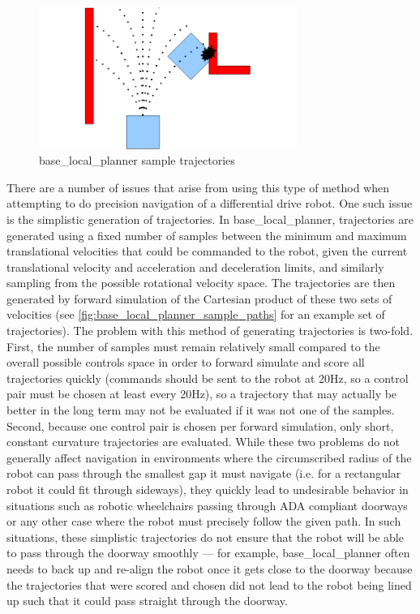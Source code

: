 \begin{figure}
\centering
\includegraphics[width=0.75\textwidth]{images/base_local_planner_sample_paths}
\caption[base\_local\_planner sample trajectories]{base\_local\_planner sample trajectories \autocite{BaseLocalPlannerWiki} \label{fig:base_local_planner_sample_paths}}
\end{figure}

There are a number of issues that arise from using this type of method when attempting to do precision navigation of a differential drive robot. One such issue is the simplistic generation of trajectories. In base\_local\_planner, trajectories are generated using a fixed number of samples between the minimum and maximum translational velocities that could be commanded to the robot, given the current translational velocity and acceleration and deceleration limits, and similarly sampling from the possible rotational velocity space. The trajectories are then generated by forward simulation of the Cartesian product of these two sets of velocities (see \autoref{fig:base_local_planner_sample_paths} for an example set of trajectories). The problem with this method of generating trajectories is two-fold. First, the number of samples must remain relatively small compared to the overall possible controls space in order to forward simulate and score all trajectories quickly (commands should be sent to the robot at 20Hz, so a control pair must be chosen at least every 20Hz), so a trajectory that may actually be better in the long term may not be evaluated if it was not one of the samples. Second, because one control pair is chosen per forward simulation, only short, constant curvature trajectories are evaluated. While these two problems do not generally affect navigation in environments where the circumscribed radius of the robot can pass through the smallest gap it must navigate (i.e. for a rectangular robot it could fit through sideways), they quickly lead to undesirable behavior in situations such as robotic wheelchairs passing through ADA compliant doorways or any other case where the robot must precisely follow the given path. In such situations, these simplistic trajectories do not ensure that the robot will be able to pass through the doorway smoothly --- for example, base\_local\_planner often needs to back up and re-align the robot once it gets close to the doorway because the trajectories that were scored and chosen did not lead to the robot being lined up such that it could pass straight through the doorway. 

